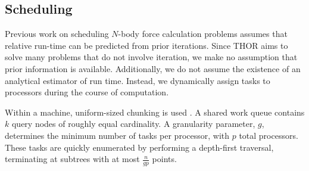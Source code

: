 \documentclass[twoside,leqno,twocolumn]{article}
\newcommand{\authornote}[1]{(\footnote{Note to self: #1})}
\newcommand{\authorsnote}[1]{\authornote{#1}}
\begin{document}
\subsection{Scheduling}

Previous work \cite{salmon_thesis, singh_thesis} on scheduling $N$-body force calculation problems assumes that relative run-time can be predicted from prior iterations.
Since THOR aims to solve many problems that do not involve iteration, we make no assumption that prior information is available.
Additionally, we do not assume the existence of an analytical estimator of run time.
Instead, we dynamically assign tasks to processors during the course of computation.


Within a machine, uniform-sized chunking is used \cite{kruskal85allocating}.
A shared work queue contains $k$ query nodes of roughly equal cardinality.
A granularity parameter, $g$, determines the minimum number of tasks per processor, with $p$ total processors.
These tasks are quickly enumerated by performing a depth-first traversal, terminating at subtrees with at most $\frac{n}{gp}$ points.
\end{document}
